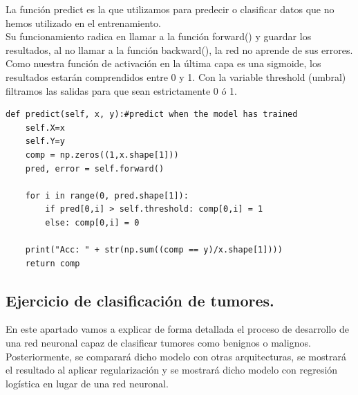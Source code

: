 \documentclass[a4paper,10pt]{article}
\begin{document}
La función predict es la que utilizamos para predecir o clasificar datos que no hemos utilizado en el entrenamiento.\\ Su funcionamiento radica en llamar a la función forward() y guardar los resultados, al no llamar a la función backward(), la red no aprende de sus errores. \\Como nuestra función de activación en la última capa es una sigmoide, los resultados estarán comprendidos entre 0 y 1. Con la variable threshold (umbral) filtramos las salidas para que sean estrictamente 0 ó 1.  
\begin{lstlisting}
def predict(self, x, y):#predict when the model has trained
    self.X=x
    self.Y=y
    comp = np.zeros((1,x.shape[1]))
    pred, error = self.forward()    
    
    for i in range(0, pred.shape[1]):
        if pred[0,i] > self.threshold: comp[0,i] = 1
        else: comp[0,i] = 0
    
    print("Acc: " + str(np.sum((comp == y)/x.shape[1]))) 
    return comp
\end{lstlisting}

\subsection{Ejercicio de clasificación de tumores.}
En este apartado vamos a explicar de forma detallada el proceso de desarrollo de una red neuronal capaz de clasificar tumores como benignos o malignos.\\
Posteriormente, se comparará dicho modelo con otras arquitecturas, se mostrará el resultado al aplicar regularización y se mostrará dicho modelo con regresión logística en lugar de una red neuronal. 
\end{document}
